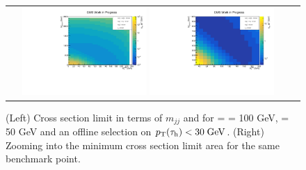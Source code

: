 \begin{figure}[tbh!]
	\centering
	\begin{tabular}{cc}
		\includegraphics[width=0.45\textwidth]{analysis/pics/JetInvMass_vs_MET_xsec_chi100_lsp050_taupt30.pdf}
		\includegraphics[width=0.45\textwidth]{analysis/pics/JetInvMass_vs_MET_xsec_chi100_lsp050_taupt30_zoom.pdf} 		
	\end{tabular}
	\caption{(Left) Cross section limit in terms of $m_{jj}$ and \met for \charginopm = \neutralinotwo = 100 GeV, \neutralinoone = 50 GeV and an offline selection on $p_{\text{T}}(\tau_{\text{h}}) <  30\;\text{Ge}\kern-0.06667em\text{V}$. (Right) Zooming into the minimum cross section limit area for the same benchmark point.}
	\label{fig::JetInvMass_vs_MET_xsec_chi100_lsp050_taupt30}
\end{figure}


